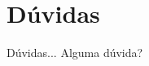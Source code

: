 \section*{Dúvidas}

\begin{frame}
	\begin{block}{Dúvidas...}
		Alguma dúvida?
	\end{block}
\end{frame}

